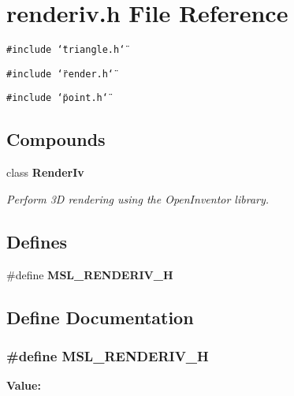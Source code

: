 \section{renderiv.h File Reference}
\label{renderiv_8h}
{\tt \#include \char`\"{}triangle.h\char`\"{}}\par
{\tt \#include \char`\"{}render.h\char`\"{}}\par
{\tt \#include \char`\"{}point.h\char`\"{}}\par
\subsection*{Compounds}
\begin{CompactItemize}
\item 
class {\bf Render\-Iv}
\begin{CompactList}\small\item\em Perform 3D rendering using the Open\-Inventor library.\item\end{CompactList}\end{CompactItemize}
\subsection*{Defines}
\begin{CompactItemize}
\item 
\#define {\bf MSL\_\-RENDERIV\_\-H}
\end{CompactItemize}


\subsection{Define Documentation}
\subsubsection{\setlength{\rightskip}{0pt plus 5cm}\#define MSL\_\-RENDERIV\_\-H}\label{renderiv_8h_a0}


{\bf Value:}\footnotesize\begin{verbatim}
\end{verbatim}\normalsize 
